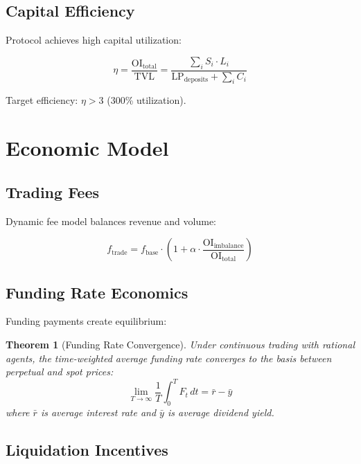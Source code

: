\documentclass[11pt,a4paper]{article}
\newtheorem{theorem}{Theorem}[section]
\begin{document}
\subsection{Capital Efficiency}

Protocol achieves high capital utilization:

\begin{equation}
\eta = \frac{\text{OI}_{\text{total}}}{\text{TVL}} = \frac{\sum_i S_i \cdot L_i}{\text{LP}_{\text{deposits}} + \sum_i C_i}
\end{equation}

Target efficiency: $\eta > 3$ (300\% utilization).

\section{Economic Model}

\subsection{Trading Fees}

Dynamic fee model balances revenue and volume:

\begin{equation}
f_{\text{trade}} = f_{\text{base}} \cdot \left(1 + \alpha \cdot \frac{\text{OI}_{\text{imbalance}}}{\text{OI}_{\text{total}}}\right)
\end{equation}

\subsection{Funding Rate Economics}

Funding payments create equilibrium:

\begin{theorem}[Funding Rate Convergence]
Under continuous trading with rational agents, the time-weighted average funding rate converges to the basis between perpetual and spot prices:
\begin{equation}
\lim_{T \to \infty} \frac{1}{T} \int_0^T F_t \, dt = \bar{r} - \bar{y}
\end{equation}
where $\bar{r}$ is average interest rate and $\bar{y}$ is average dividend yield.
\end{theorem}

\subsection{Liquidation Incentives}
\end{document}
